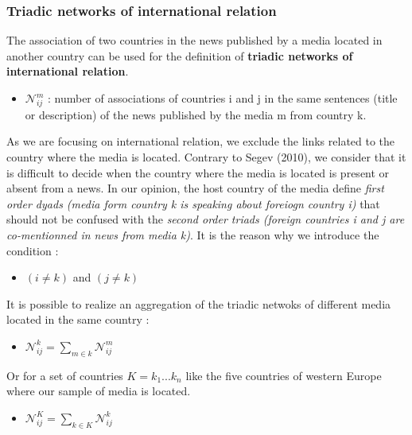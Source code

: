 \documentclass[
]{article}
\providecommand{\tightlist}{%
  \setlength{\itemsep}{0pt}\setlength{\parskip}{0pt}}
\begin{document}
\hypertarget{triadic-networks-of-international-relation}{%
\subsubsection{Triadic networks of international
relation}\label{triadic-networks-of-international-relation}}

The association of two countries in the news published by a media
located in another country can be used for the definition of
\textbf{triadic networks of international relation}.

\begin{itemize}
\tightlist
\item
  \(\mathcal{N}_{ij}^{m}\) : number of associations of countries i and j
  in the same sentences (title or description) of the news published by
  the media m from country k.
\end{itemize}

As we are focusing on international relation, we exclude the links
related to the country where the media is located. Contrary to Segev
(2010), we consider that it is difficult to decide when the country
where the media is located is present or absent from a news. In our
opinion, the host country of the media define \emph{first order dyads
(media form country k is speaking about foreiogn country i)} that should
not be confused with the \emph{second order triads (foreign countries i
and j are co-mentionned in news from media k)}. It is the reason why we
introduce the condition :

\begin{itemize}
\tightlist
\item
  \((i \neq k)\) and \((j \neq k)\)
\end{itemize}

It is possible to realize an aggregation of the triadic netwoks of
different media located in the same country :

\begin{itemize}
\tightlist
\item
  \(\mathcal{N}_{ij}^{k} = \sum_{m \in k } \mathcal{N}_{ij}^{m}\)
\end{itemize}

Or for a set of countries \(K = {k_1... k_n}\) like the five countries
of western Europe where our sample of media is located.

\begin{itemize}
\tightlist
\item
  \(\mathcal{N}_{ij}^{K} = \sum_{k \in K} \mathcal{N}_{ij}^{k}\)
\end{itemize}
\end{document}
